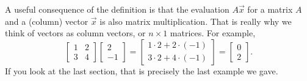 A useful consequence of the definition is that the evaluation
$A \vec{x}$ for a matrix $A$
and a (column) vector $\vec{x}$ is also matrix multiplication.
That is really why we think of
vectors as column vectors, or $n \times 1$ matrices.
For example,
\begin{equation*}
\begin{bmatrix}
1 & 2 \\ 3 & 4
\end{bmatrix}
\begin{bmatrix}
2 \\ -1
\end{bmatrix} 
=
\begin{bmatrix}
1 \cdot 2 + 2 \cdot (-1) \\
3 \cdot 2 + 4 \cdot (-1)
\end{bmatrix}
=
\begin{bmatrix}
0 \\ 2
\end{bmatrix}  .
\end{equation*}
If you look at the last section, that is precisely the last
example we gave.

